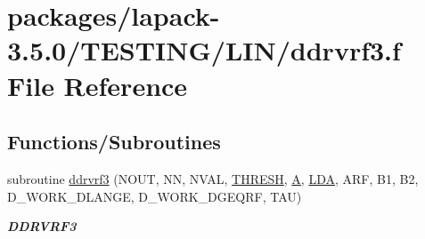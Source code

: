 \hypertarget{ddrvrf3_8f}{}\section{packages/lapack-\/3.5.0/\+T\+E\+S\+T\+I\+N\+G/\+L\+I\+N/ddrvrf3.f File Reference}
\label{ddrvrf3_8f}
\subsection*{Functions/\+Subroutines}
\begin{DoxyCompactItemize}
\item 
subroutine \hyperlink{group__double__lin_ga7ecb33ca2814a6543f4b7d1c8c1250d2}{ddrvrf3} (N\+O\+U\+T, N\+N, N\+V\+A\+L, \hyperlink{zlaqgs_8c_a0656018abfc9fa2821827415f5d5ea57}{T\+H\+R\+E\+S\+H}, \hyperlink{classA}{A}, \hyperlink{example__user_8c_ae946da542ce0db94dced19b2ecefd1aa}{L\+D\+A}, A\+R\+F, B1, B2, D\+\_\+\+W\+O\+R\+K\+\_\+\+D\+L\+A\+N\+G\+E, D\+\_\+\+W\+O\+R\+K\+\_\+\+D\+G\+E\+Q\+R\+F, T\+A\+U)
\begin{DoxyCompactList}\small\item\em {\bfseries D\+D\+R\+V\+R\+F3} \end{DoxyCompactList}\end{DoxyCompactItemize}
